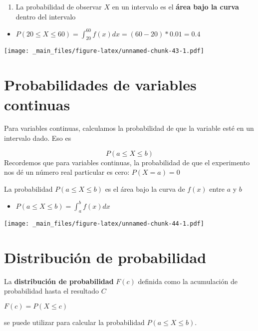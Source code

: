 \documentclass[
]{book}
\providecommand{\tightlist}{%
  \setlength{\itemsep}{0pt}\setlength{\parskip}{0pt}}
\begin{document}
\begin{enumerate}
\def\labelenumi{\arabic{enumi})}
\setcounter{enumi}{2}
\tightlist
\item
  La probabilidad de observar \(X\) en un intervalo es el \textbf{área bajo la curva} dentro del intervalo
\end{enumerate}

\begin{itemize}
\tightlist
\item
  \(P( 20 \leq X \leq 60) = \int_{20}^{60} f(x) dx = (60-20)*0.01=0.4\)
\end{itemize}

\texttt{[image: \_main\_files/figure-latex/unnamed-chunk-43-1.pdf]}

\hypertarget{probabilidades-de-variables-continuas}{%
\section{Probabilidades de variables continuas}\label{probabilidades-de-variables-continuas}}

Para variables continuas, calculamos la probabilidad de que la variable esté en un intervalo dado. Eso es

\[P( a \leq X \leq b)\]
Recordemos que para variables continuas, la probabilidad de que el experimento nos dé un número real particular es cero: \(P(X= a)= 0\)

La probabilidad \(P( a \leq X \leq b)\) es el área bajo la curva de \(f(x)\) entre \(a\) y \(b\)

\begin{itemize}
\tightlist
\item
  \(P( a \leq X \leq b) = \int_{a}^{b} f(x) dx\)
\end{itemize}

\texttt{[image: \_main\_files/figure-latex/unnamed-chunk-44-1.pdf]}

\hypertarget{distribuciuxf3n-de-probabilidad-1}{%
\section{Distribución de probabilidad}\label{distribuciuxf3n-de-probabilidad-1}}

La \textbf{distribución de probabilidad} \(F(c)\) definida como la acumulación de probabilidad hasta el resultado \(C\)

\(F(c) = P( X \leq c)\)

se puede utilizar para calcular la probabilidad \(P( a \leq X \leq b)\).
\end{document}
